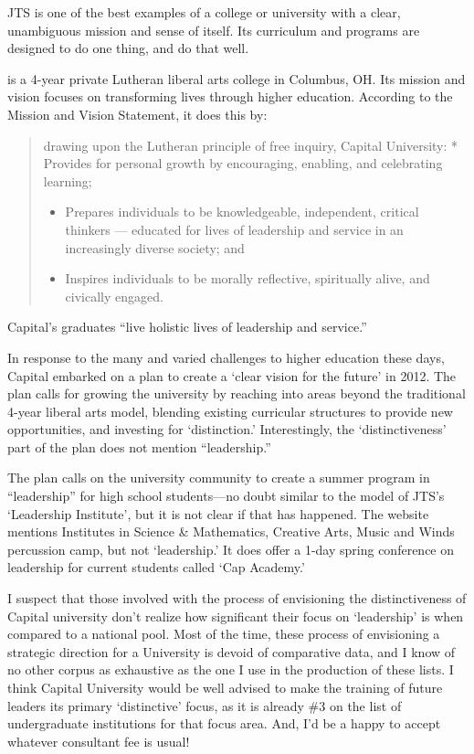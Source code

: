 JTS is one of the best examples of a college or university with a clear, unambiguous mission and sense of itself. Its curriculum and programs are designed to do one thing, and do that well. 

 is a 4-year private Lutheran liberal arts college in Columbus, OH. Its mission and vision focuses on transforming lives through higher education. According to the Mission and Vision Statement, it does this by:

\begin{quote}

drawing upon the Lutheran principle of free inquiry, Capital University:
* Provides for personal growth by encouraging, enabling, and celebrating learning;

\begin{itemize}
\item Prepares individuals to be knowledgeable, independent, critical thinkers --- educated for lives of leadership and service in an increasingly diverse society; and

\item Inspires individuals to be morally reflective, spiritually alive, and civically engaged.

\end{itemize}
\end{quote}

Capital's graduates ``live holistic lives of leadership and service.''

In response to the many and varied challenges to higher education these days, Capital embarked on a plan to create a `clear vision for the future' in 2012. The plan calls for growing the university by reaching into areas beyond the traditional 4-year liberal arts model, blending existing curricular structures to provide new opportunities, and investing for `distinction.' Interestingly, the `distinctiveness' part of the plan does not mention ``leadership.''

The plan calls on the university community to create a summer program in ``leadership'' for high school students---no doubt similar to the model of JTS's `Leadership Institute', but it is not clear if that has happened. The website mentions Institutes in Science \& Mathematics, Creative Arts, Music and Winds percussion camp, but not `leadership.' It does offer a 1-day spring conference on leadership for current students called `Cap Academy.'

I suspect that those involved with the process of envisioning the distinctiveness of Capital university don't realize how significant their focus on `leadership' is when compared to a national pool. Most of the time, these process of envisioning a strategic direction for a University is devoid of comparative data, and I know of no other corpus as exhaustive as the one I use in the production of these lists. I think Capital University would be well advised to make the training of future leaders its primary `distinctive' focus, as it is already \#3 on the list of undergraduate institutions for that focus area. And, I'd be a happy to accept whatever consultant fee is usual!

